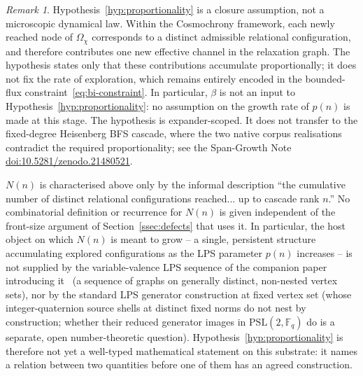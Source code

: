\documentclass[11pt,a4paper]{article}
\theoremstyle{definition}
\theoremstyle{remark}
\newtheorem{remark}[theorem]{Remark}
\begin{document}
    \begin{remark}
      \label{rem:hyp-status}
      Hypothesis~\ref{hyp:proportionality} is a closure assumption, not a microscopic
      dynamical law.
      Within the Cosmochrony framework, each newly reached node of $\Omega_\chi$ corresponds
      to a distinct admissible relational configuration, and therefore contributes one new
      effective channel in the relaxation graph.
      The hypothesis states only that these contributions accumulate proportionally; it does
      not fix the rate of exploration, which remains entirely encoded in the bounded-flux
      constraint~\eqref{eq:bi-constraint}.
      In particular, $\beta$ is not an input to Hypothesis~\ref{hyp:proportionality}: no
      assumption on the growth rate of $p(n)$ is made at this stage.
      The hypothesis is expander-scoped.  It does not transfer to the fixed-degree
      Heisenberg BFS cascade, where the two native corpus realisations contradict the
      required proportionality; see the Span-Growth Note
      \href{https://doi.org/10.5281/zenodo.21480521}{doi:10.5281/zenodo.21480521}.

      $N(n)$ is characterised above only by the informal description ``the cumulative number
      of distinct relational configurations reached... up to cascade rank $n$.''
      No combinatorial definition or recurrence for $N(n)$ is given independent of the
      front-size argument of Section~\ref{ssec:defects} that uses it.
      In particular, the host object on which $N(n)$ is meant to grow -- a single, persistent
      structure accumulating explored configurations as the LPS parameter $p(n)$ increases --
      is not supplied by the variable-valence LPS sequence of the companion paper introducing
      it~\cite{Beau2026a6} (a sequence of graphs on generally distinct, non-nested vertex
      sets), nor by the standard LPS generator construction at fixed vertex set (whose
      integer-quaternion source shells at distinct fixed norms do not nest by construction;
      whether their reduced generator images in $\mathrm{PSL}(2,\mathbb F_q)$ do is a
      separate, open number-theoretic question).
      Hypothesis~\ref{hyp:proportionality} is therefore not yet a well-typed mathematical
      statement on this substrate: it names a relation between two quantities before one of
      them has an agreed construction.
    \end{remark}
\end{document}
